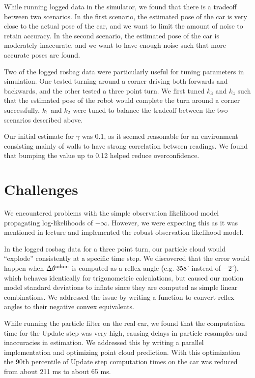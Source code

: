 \documentclass[11pt]{article}
\begin{document}
While running logged data in the simulator, we found that there is a tradeoff
between two scenarios. In the first scenario, the estimated pose of the car is
very close to the actual pose of the car, and we want to limit the amount of
noise to retain accuracy. In the second scenario, the estimated pose of the car
is moderately inaccurate, and we want to have enough noise such that more
accurate poses are found.

Two of the logged rosbag data were particularly useful for tuning parameters in
simulation. One tested turning around a corner driving both forwards and
backwards, and the other tested a three point turn. We first tuned $k_3$ and
$k_4$ such that the estimated pose of the robot would complete the turn around a
corner successfully. $k_1$ and $k_2$ were tuned to balance the tradeoff between
the two scenarios described above.

Our initial estimate for $\gamma$ was 0.1, as it seemed reasonable for an
environment consisting mainly of walls to have strong correlation between
readings. We found that bumping the value up to 0.12 helped reduce
overconfidence.

\section{Challenges}

We encountered problems with the simple observation likelihood model propagating
log-likelihoods of $-\infty$. However, we were expecting this as it was
mentioned in lecture and implemented the robust observation likelihood model.

In the logged rosbag data for a three point turn, our particle cloud would
``explode'' consistently at a specific time step. We discovered that the error
would happen when $\Delta \theta^{\textrm{odom}}$ is computed as a reflex angle (e.g.
$358^{\circ}$ instead of $-2^{\circ}$), which behaves identically for
trigonometric calculations, but caused our motion model standard deviations to
inflate since they are computed as simple linear combinations. We addressed the
issue by writing a function to convert reflex angles to their negative convex
equivalents.

While running the particle filter on the real car, we found that the computation
time for the Update step was very high, causing delays in particle resamples and
inaccuracies in estimation. We addressed this by writing a parallel
implementation and optimizing point cloud prediction. With this optimization the
90th percentile of Update step computation times on the car was reduced from
about 211 ms to about 65 ms.
\end{document}
